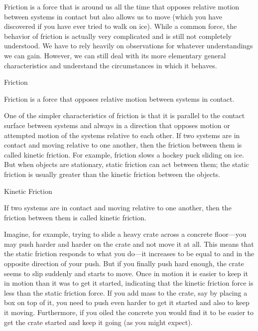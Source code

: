 \documentclass[
]{book}
\begin{document}
\protect\hypertarget{import-auto-id1165298484489}{}{Friction} is a force
that is around us all the time that opposes relative motion between
systems in contact but also allows us to move (which you have discovered
if you have ever tried to walk on ice). While a common force, the
behavior of friction is actually very complicated and is still not
completely understood. We have to rely heavily on observations for
whatever understandings we can gain. However, we can still deal with its
more elementary general characteristics and understand the circumstances
in which it behaves.

\hypertarget{fs-id1737207}{}
Friction

Friction is a force that opposes relative motion between systems in
contact.

One of the simpler characteristics of friction is that it is parallel to
the contact surface between systems and always in a direction that
opposes motion or attempted motion of the systems relative to each
other. If two systems are in contact and moving relative to one another,
then the friction between them is called \protect\hypertarget{import-auto-id1165296294917}{}{kinetic
friction}. For example,
friction slows a hockey puck sliding on ice. But when objects are
stationary, \protect\hypertarget{import-auto-id1165298806829}{}{static friction}\textbf{} can act between
them; the static friction is usually greater than the kinetic friction
between the objects.

\hypertarget{fs-id1529028}{}
Kinetic Friction

If two systems are in contact and moving relative to one another, then
the friction between them is called kinetic friction.

Imagine, for example, trying to slide a heavy crate across a concrete
floor---you may push harder and harder on the crate and not move it at
all. This means that the static friction responds to what you do---it
increases to be equal to and in the opposite direction of your push. But
if you finally push hard enough, the crate seems to slip suddenly and
starts to move. Once in motion it is easier to keep it in motion than it
was to get it started, indicating that the kinetic friction force is
less than the static friction force. If you add mass to the crate, say
by placing a box on top of it, you need to push even harder to get it
started and also to keep it moving. Furthermore, if you oiled the
concrete you would find it to be easier to get the crate started and
keep it going (as you might expect).
\end{document}
